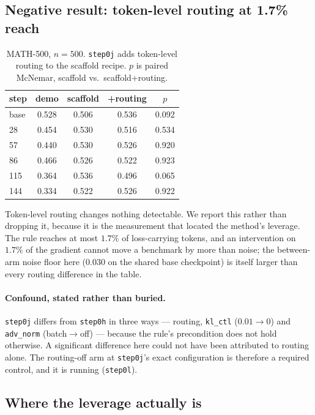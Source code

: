 \subsection{Negative result: token-level routing at 1.7\% reach}
\label{sec:negative}

\begin{table}[t]
\centering\small
\caption{MATH-500, $n=500$. \texttt{step0j} adds token-level routing to the scaffold recipe.
$p$ is paired McNemar, scaffold vs.\ scaffold+routing.}
\label{tab:token}
\begin{tabular}{lccc c}
\toprule
step & demo & scaffold & +routing & $p$ \\
\midrule
base & 0.528 & 0.506 & 0.536 & 0.092 \\
28   & 0.454 & 0.530 & 0.516 & 0.534 \\
57   & 0.440 & 0.530 & 0.526 & 0.920 \\
86   & 0.466 & 0.526 & 0.522 & 0.923 \\
115  & 0.364 & 0.536 & 0.496 & 0.065 \\
144  & 0.334 & 0.522 & 0.526 & 0.922 \\
\bottomrule
\end{tabular}
\end{table}

Token-level routing changes nothing detectable. We report this rather than dropping it,
because it is the measurement that located the method's leverage. The rule reaches at most
$1.7\%$ of loss-carrying tokens, and an intervention on $1.7\%$ of the gradient cannot move
a benchmark by more than noise; the between-arm noise floor here ($0.030$ on the shared base
checkpoint) is itself larger than every routing difference in the table.

\paragraph{Confound, stated rather than buried.} \texttt{step0j} differs from
\texttt{step0h} in three ways --- routing, \texttt{kl\_ctl} ($0.01\!\to\!0$) and
\texttt{adv\_norm} (batch$\to$off) --- because the rule's precondition does not hold
otherwise. A significant difference here could not have been attributed to routing alone.
The routing-off arm at \texttt{step0j}'s exact configuration is therefore a required
control, and it is running (\texttt{step0l}).

\subsection{Where the leverage actually is}
\label{sec:leverage}

